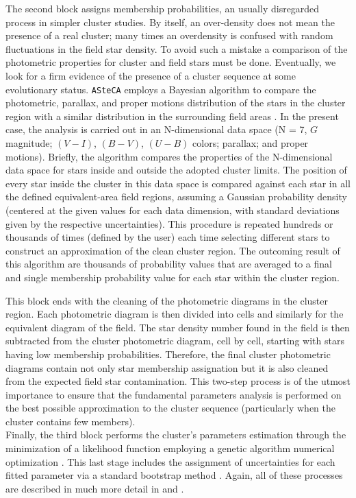 \documentclass[draft]{aa}
\begin{document}
The second block assigns membership probabilities, an
usually disregarded process in simpler cluster studies. By itself, an
over-density does not mean the presence of a real cluster; many times an
overdensity is confused with random fluctuations in the field star density. To
avoid such a mistake a comparison of the photometric
properties for cluster and field stars must be done. Eventually, we
look for a firm evidence of the presence of a cluster sequence at some
evolutionary status. \texttt{ASteCA} employs a Bayesian algorithm to 
compare the photometric, parallax, and proper motions distribution of the stars
in the cluster region with a similar distribution in the surrounding field
areas \citep{Perren_2015}. In the present case, the analysis is carried out in 
an N-dimensional data space (N = 7, $G$ magnitude; $(V-I)$, $(B-V)$, $(U-B)$
colors; parallax; and proper motions).
%
Briefly, the algorithm compares the properties of the N-dimensional data space
for stars inside and outside the adopted cluster limits.
The position of every star inside the cluster in this data space
is compared against each star in all the defined equivalent-area field regions,
assuming a Gaussian probability density (centered at the given values for each
data dimension, with standard deviations given by the respective
uncertainties). This procedure is repeated hundreds or thousands of times 
(defined by the user) each time selecting different stars to construct an
approximation of the clean cluster region. The outcoming result of this
algorithm are thousands of probability values that are averaged to a final and
single membership probability value for each star within the cluster region.

This block ends with the cleaning of the photometric
diagrams in the cluster region. Each photometric diagram is then divided into
cells and similarly for the equivalent diagram of the field. The star density
number found in the field is then subtracted from the
cluster photometric diagram, cell by cell, starting with stars having low
membership probabilities. Therefore, the final cluster photometric diagrams
contain not only star membership assignation but it is also cleaned from the
expected field star contamination. This two-step process is of the utmost
importance to ensure that the fundamental parameters analysis is performed on
the best possible approximation to the cluster sequence (particularly when
the cluster contains few members).\\

Finally, the third block performs the cluster's parameters estimation through
the minimization of a likelihood function \citep{Dolphin_2002} employing a
genetic algorithm numerical optimization \citep{Charbonneau_1995}. This last
stage includes the assignment of uncertainties for each fitted parameter via a
standard bootstrap method \citep{efron1986}. Again, all of these processes are
described in much more detail in \cite{Perren_2015} and \cite{Perren_2017}.
\end{document}
